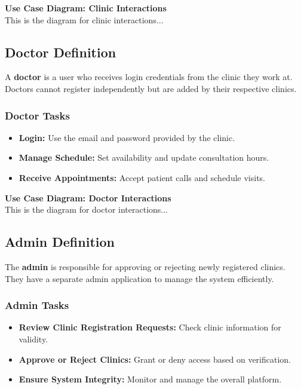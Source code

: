 \documentclass[12pt]{report}
\begin{document}
\vspace{0.5cm}  
\noindent \textbf{Use Case Diagram: Clinic Interactions}  
\\This is the diagram for clinic interactions...\\  

\subsection{\textbf{Doctor Definition}}  
\noindent A \textbf{doctor} is a user who receives login credentials from the clinic they work at. Doctors cannot register independently but are added by their respective clinics.  

\subsubsection{\textbf{Doctor Tasks}}  
\begin{itemize}  
    \item \textbf{Login:} Use the email and password provided by the clinic.  
    \item \textbf{Manage Schedule:} Set availability and update consultation hours.  
    \item \textbf{Receive Appointments:} Accept patient calls and schedule visits.  
\end{itemize}  

\vspace{0.5cm}  
\noindent \textbf{Use Case Diagram: Doctor Interactions}  
\\This is the diagram for doctor interactions...\\  

\subsection{\textbf{Admin Definition}}  

\noindent The \textbf{admin} is responsible for approving or rejecting newly registered clinics. They have a separate admin application to manage the system efficiently.  

\subsubsection{\textbf{Admin Tasks}}  
\begin{itemize}  
    \item \textbf{Review Clinic Registration Requests:} Check clinic information for validity.  
    \item \textbf{Approve or Reject Clinics:} Grant or deny access based on verification.  
    \item \textbf{Ensure System Integrity:} Monitor and manage the overall platform.  
\end{itemize}  
\end{document}
